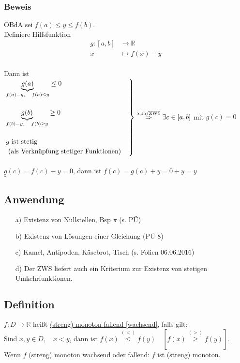 \documentclass[12pt, titlepage]{article}
\newcommand{\R}{\mathds{R}}
\renewenvironment{rcases}{%
	\left.\renewcommand*\lbrace.%
	\begin{cases}}%
	{\end{cases}\right\rbrace}
\renewcommand{\>}{\rightarrow}
\renewcommand{\*}{\cdot}
\begin{document}
	\subsubsection*{Beweis}
	OBdA sei $f(a)\leq y\leq f(b)$.\\
	Definiere Hilfsfunktion
	\begin{align*}
		g\colon[a,b]&\>\R\\
		x&\mapsto f(x)-y
	\end{align*}\\
	\newpage
	Dann ist\\
	$\begin{rcases}
	\underbrace{g(a)}_{f(a)-y,\quad f(a)\leq y}\leq0\\
	\\
	\underbrace{g(b)}_{f(b)-y,\quad f(b)\geq y}\geq0\\
	\\
	g\textrm{ ist stetig}\\
	\textrm{  (als Verknüpfung stetiger Funktionen)}
	\end{rcases}\overset{5.15\textrm{/ZWS}}{\Rightarrow}\exists c\in[a,b]$ mit $g(c)=0$\\
	\\
	$g(c)=f(c)-y=0$, dann ist $f(c)=g(c)+y=0+y=y$\\
	\hspace*{\fill}$\square$
	\subsection{Anwendung}
	\begin{itemize}
		\item[a)] Existenz von Nullstellen, Bsp $\pi$ (s. PÜ)
		\item[b)] Existenz von Lösungen einer Gleichung (PÜ 8)
		\item[c)] Kamel, Antipoden, Käsebrot, Tisch (s. Folien 06.06.2016)
		\item[d)] Der ZWS liefert auch ein Kriterium zur Existenz von stetigen Umkehrfunktionen.
	\end{itemize}
	\subsection{Definition}
	$f\colon D\>\R$ heißt \underline{(streng) monoton fallend [wachsend]}, falls gilt:\\
	Sind $x,y\in D,\quad x<y$, dann ist $f(x)\overset{(<)}{\leq} f(y)\quad[f(x)\overset{(>)}{\geq}f(y)]$.\\
	Wenn $f$ (streng) monoton wachsend oder fallend: $f$ ist (streng) monoton.
\end{document}
